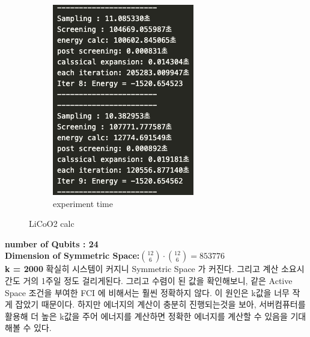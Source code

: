 \documentclass[11pt]{article}
\begin{document}
\begin{figure}[H]
\begin{subfigure}[b]{0.3\textwidth}
    \includegraphics[width=\textwidth]{fig/tot_exp.png}
    \caption{experiment time}
    \label{fig:second}
  \end{subfigure}
  \caption{LiCoO2 calc}
  \label{fig:two_figures_side_by_side}
\end{figure}

\textbf{number of Qubits : 24}\\
\textbf{Dimension of Symmetric Space:\(\binom{12}{6}\cdot\binom{12}{6}=853776\)}\\
\textbf{k = 2000}
확실히 시스템이 커지니 Symmetric Space 가 커진다. 그리고 계산 소요시간도 거의 1주일 정도 걸리게된다. 
그리고 수렴이 된 값을 확인해보니, 같은 Active Space 조건을 부여한 FCI 에 비해서는 훨씬 정확하지 않다. 이 원인은 k값을 너무 작게 잡았기 때문이다. 
하지만 에너지의 계산이 충분히 진행되는것을 보아, 서버컴퓨터를 활용해 더 높은 k값을 주어 에너지를 계산하면 정확한 에너지를 계산할 수 있음을 기대해볼 수 있다. 
\end{document}
